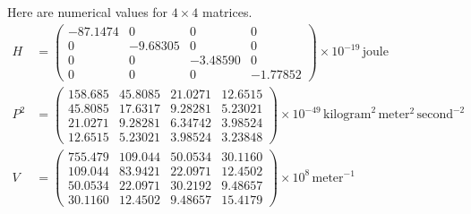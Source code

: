 \documentclass[12pt]{article}
\begin{document}
\noindent
Here are numerical values for $4\times4$ matrices.
\begin{align*}
H&=\begin{pmatrix}
-87.1474 & 0 & 0 & 0 \\[1ex]
0 & -9.68305 & 0 & 0 \\[1ex]
0 & 0 & -3.48590 & 0 \\[1ex]
0 & 0 & 0 & -1.77852
\end{pmatrix}\times10^{-19}\,\text{joule}
\\[2ex]
P^2&=\begin{pmatrix}
158.685 & 45.8085 & 21.0271 & 12.6515 \\[1ex]
45.8085 & 17.6317 & 9.28281 & 5.23021 \\[1ex]
21.0271 & 9.28281 & 6.34742 & 3.98524 \\[1ex]
12.6515 & 5.23021 & 3.98524 & 3.23848
\end{pmatrix}\times10^{-49}\,\text{kilogram}^2\,\text{meter}^2\,\text{second}^{-2}
\\[2ex]
V&=\begin{pmatrix}
755.479 & 109.044 & 50.0534 & 30.1160 \\[1ex]
109.044 & 83.9421 & 22.0971 & 12.4502 \\[1ex]
50.0534 & 22.0971 & 30.2192 & 9.48657 \\[1ex]
30.1160 & 12.4502 & 9.48657 & 15.4179
\end{pmatrix}\times10^8\,\text{meter}^{-1}
\end{align*}
\end{document}
